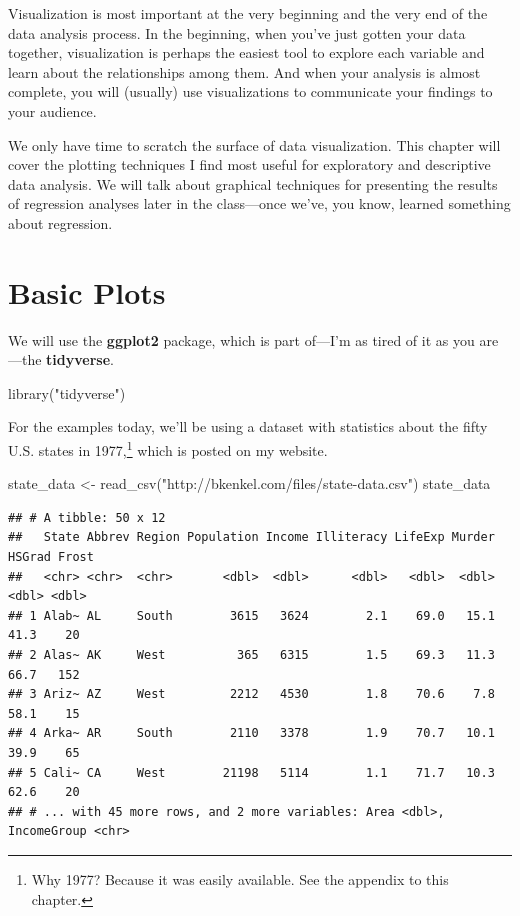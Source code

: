 \documentclass[
  12pt,
  oneside,openany]{book}
\newenvironment{Shaded}{\begin{snugshade}}{\end{snugshade}}
\newcommand{\FunctionTok}[1]{\textcolor[rgb]{0.00,0.00,0.00}{#1}}
\newcommand{\NormalTok}[1]{#1}
\newcommand{\OtherTok}[1]{\textcolor[rgb]{0.56,0.35,0.01}{#1}}
\newcommand{\StringTok}[1]{\textcolor[rgb]{0.31,0.60,0.02}{#1}}
\begin{document}
Visualization is most important at the very beginning and the very end of the data analysis process. In the beginning, when you've just gotten your data together, visualization is perhaps the easiest tool to explore each variable and learn about the relationships among them. And when your analysis is almost complete, you will (usually) use visualizations to communicate your findings to your audience.

We only have time to scratch the surface of data visualization. This chapter will cover the plotting techniques I find most useful for exploratory and descriptive data analysis. We will talk about graphical techniques for presenting the results of regression analyses later in the class---once we've, you know, learned something about regression.

\hypertarget{basic-plots}{%
\section{Basic Plots}\label{basic-plots}}

We will use the \textbf{ggplot2} package, which is part of---I'm as tired of it as you are---the \textbf{tidyverse}.

\begin{Shaded}
\begin{Highlighting}[]
\FunctionTok{library}\NormalTok{(}\StringTok{"tidyverse"}\NormalTok{)}
\end{Highlighting}
\end{Shaded}

For the examples today, we'll be using a dataset with statistics about the fifty U.S. states in 1977,\footnote{Why 1977? Because it was easily available. See the appendix to this chapter.} which is posted on my website.

\begin{Shaded}
\begin{Highlighting}[]
\NormalTok{state\_data }\OtherTok{\textless{}{-}} \FunctionTok{read\_csv}\NormalTok{(}\StringTok{"http://bkenkel.com/files/state{-}data.csv"}\NormalTok{)}
\NormalTok{state\_data}
\end{Highlighting}
\end{Shaded}

\begin{verbatim}
## # A tibble: 50 x 12
##   State Abbrev Region Population Income Illiteracy LifeExp Murder HSGrad Frost
##   <chr> <chr>  <chr>       <dbl>  <dbl>      <dbl>   <dbl>  <dbl>  <dbl> <dbl>
## 1 Alab~ AL     South        3615   3624        2.1    69.0   15.1   41.3    20
## 2 Alas~ AK     West          365   6315        1.5    69.3   11.3   66.7   152
## 3 Ariz~ AZ     West         2212   4530        1.8    70.6    7.8   58.1    15
## 4 Arka~ AR     South        2110   3378        1.9    70.7   10.1   39.9    65
## 5 Cali~ CA     West        21198   5114        1.1    71.7   10.3   62.6    20
## # ... with 45 more rows, and 2 more variables: Area <dbl>, IncomeGroup <chr>
\end{verbatim}
\end{document}
